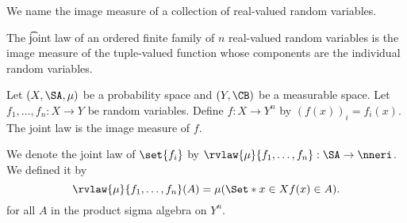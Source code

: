 

We name the image measure of a collection of real-valued random variables.


The \t{joint law} of an ordered finite family of $n$ real-valued random variables is the image measure of the tuple-valued function whose components are the individual random variables.


Let $(X, \SA, \mu)$ be a probability space and $(Y, \CB)$ be a measurable space.
Let $f_1, \dots, f_n: X \to Y$ be random variables.
Define $f: X \to Y^n$ by $(f(x))_i = f_i(x)$.
The joint law is the image measure of $f$.

We denote the joint law of $\set{f_i}$ by $\rvlaw{\mu}{f_1, \dots, f_n}: \SA \to \nneri$.
We defined it by
\[
  \rvlaw{\mu}{f_1, \dots, f_n}(A)
  = \mu(\Set*{x \in X}{f(x) \in A}).
\]
for all $A$ in the product sigma algebra on $Y^n$.

\blankpage

